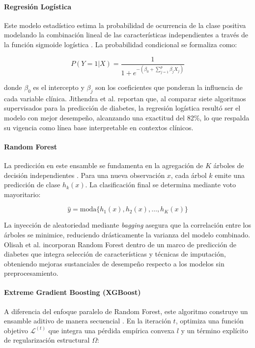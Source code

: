 \documentclass[journal]{IEEEtran}
\begin{document}
\paragraph{Regresión Logística}
Este modelo estadístico estima la probabilidad de ocurrencia de la clase positiva modelando la combinación lineal de las características independientes a través de la función sigmoide logística \cite{Cox1958}. La probabilidad condicional se formaliza como:

\begin{equation}
P(Y=1|X) = \frac{1}{1 + e^{-(\beta_0 + \sum_{j=1}^{p} \beta_j X_j)}}
\end{equation}

donde $\beta_0$ es el intercepto y $\beta_j$ son los coeficientes que ponderan la influencia de cada variable clínica. Jithendra et al. \cite{Jithendra2023} reportan que, al comparar siete algoritmos supervisados para la predicción de diabetes, la regresión logística resultó ser el modelo con mejor desempeño, alcanzando una exactitud del 82\%, lo que respalda su vigencia como línea base interpretable en contextos clínicos.

\paragraph{Random Forest}
La predicción en este ensamble se fundamenta en la agregación de $K$ árboles de decisión independientes \cite{Breiman2001}. Para una nueva observación $x$, cada árbol $k$ emite una predicción de clase $h_k(x)$. La clasificación final se determina mediante voto mayoritario:

\begin{equation}
\hat{y} = \text{moda}\{h_1(x), h_2(x), \dots, h_K(x)\}
\end{equation}

La inyección de aleatoriedad mediante \textit{bagging} asegura que la correlación entre los árboles se minimice, reduciendo drásticamente la varianza del modelo combinado. Olisah et al. \cite{Olisah2022} incorporan Random Forest dentro de un marco de predicción de diabetes que integra selección de características y técnicas de imputación, obteniendo mejoras sustanciales de desempeño respecto a los modelos sin preprocesamiento.

\paragraph{Extreme Gradient Boosting (XGBoost)}
A diferencia del enfoque paralelo de Random Forest, este algoritmo construye un ensamble aditivo de manera secuencial \cite{Chen2016}. En la iteración $t$, optimiza una función objetivo $\mathcal{L}^{(t)}$ que integra una pérdida empírica convexa $l$ y un término explícito de regularización estructural $\Omega$:
\end{document}
